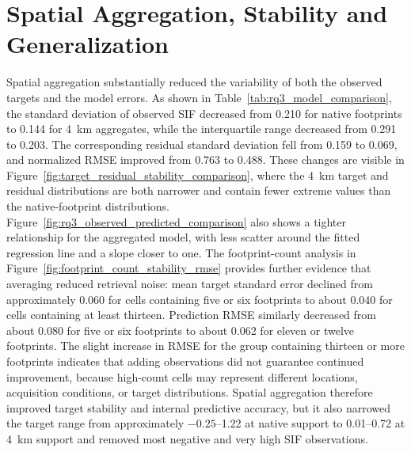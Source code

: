 \section{Spatial Aggregation, Stability and Generalization}
Spatial aggregation substantially reduced the variability of both the observed targets and the model errors. As shown in Table~\ref{tab:rq3_model_comparison}, the standard deviation of observed SIF decreased from 0.210 for native footprints to 0.144 for 4~km aggregates, while the interquartile range decreased from 0.291 to 0.203. The corresponding residual standard deviation fell from 0.159 to 0.069, and normalized RMSE improved from 0.763 to 0.488. These changes are visible in Figure~\ref{fig:target_residual_stability_comparison}, where the 4~km target and residual distributions are both narrower and contain fewer extreme values than the native-footprint distributions. Figure~\ref{fig:rq3_observed_predicted_comparison} also shows a tighter relationship for the aggregated model, with less scatter around the fitted regression line and a slope closer to one. The footprint-count analysis in Figure~\ref{fig:footprint_count_stability_rmse} provides further evidence that averaging reduced retrieval noise: mean target standard error declined from approximately 0.060 for cells containing five or six footprints to about 0.040 for cells containing at least thirteen. Prediction RMSE similarly decreased from about 0.080 for five or six footprints to about 0.062 for eleven or twelve footprints. The slight increase in RMSE for the group containing thirteen or more footprints indicates that adding observations did not guarantee continued improvement, because high-count cells may represent different locations, acquisition conditions, or target distributions. Spatial aggregation therefore improved target stability and internal predictive accuracy, but it also narrowed the target range from approximately $-0.25$--1.22 at native support to 0.01--0.72 at 4~km support and removed most negative and very high SIF observations.

